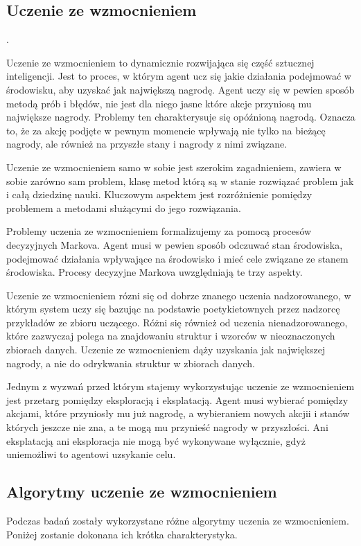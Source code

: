 \subsection{Uczenie ze wzmocnieniem}. 

Uczenie ze wzmocnieniem to dynamicznie rozwijająca się część sztucznej inteligencji.
Jest to proces, w którym agent ucz się jakie działania podejmować w środowisku, 
aby uzyskać jak największą nagrodę. Agent uczy się w pewien sposób metodą prób i błędów,
nie jest dla niego jasne które akcje przyniosą mu największe nagrody. Problemy ten 
charakterysuje się opóźnioną nagrodą. Oznacza to, że za akcję podjęte w pewnym momencie 
wpływają nie tylko na bieżącę nagrody, ale również na przyszłe stany i nagrody z nimi związane.

Uczenie ze wzmocnieniem samo w sobie jest szerokim zagadnieniem, zawiera w sobie zarówno sam problem,
klasę metod którą są w stanie rozwiązać problem jak i całą dziedzinę nauki. Kluczowym aspektem 
jest rozróżnienie pomiędzy problemem a metodami służącymi do jego rozwiązania.

Problemy uczenia ze wzmocnieniem formalizujemy za pomocą procesów decyzyjnych Markova.
Agent musi w pewien sposób odczuwać stan środowiska, podejmować działania wpływające na środowisko 
i mieć cele związane ze stanem środowiska. Procesy decyzyjne Markova uwzględniają te trzy aspekty.

Uczenie ze wzmocnieniem rózni się od dobrze znanego uczenia nadzorowanego, w którym system uczy 
się bazując na podstawie poetykietownych przez nadzorcę przykładów ze zbioru uczącego.
Różni się również od uczenia nienadzorowanego, które zazwyczaj polega na znajdowaniu 
struktur i wzorców w nieoznaczonych zbiorach danych. Uczenie ze wzmocnieniem dąży 
uzyskania jak największej nagrody, a nie do odrykwania struktur w zbiorach danych.

Jednym z wyzwań przed którym stajemy wykorzystując uczenie ze wzmocnieniem jest przetarg 
pomiędzy eksploracją i eksplatacją. Agent musi wybierać pomiędzy akcjami, które przyniosły mu już 
nagrodę, a wybieraniem nowych akcjii i stanów których jeszcze nie zna, a te mogą mu przynieść 
nagrody w przyszłości. Ani eksplatacją ani eksploracja nie mogą być wykonywane wyłącznie,
gdyż uniemożliwi to agentowi uzsykanie celu.

\subsection{Algorytmy uczenie ze wzmocnieniem}
Podczas badań zostały wykorzystane różne algorytmy uczenia ze wzmocnieniem. Poniżej zostanie dokonana
ich krótka charakterystyka.


